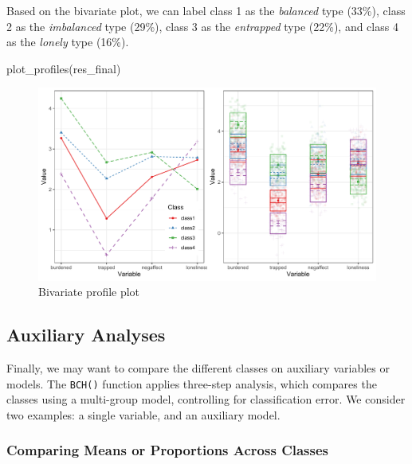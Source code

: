\documentclass[
  man,floatsintext]{apa6}
\newenvironment{Shaded}{\begin{snugshade}}{\end{snugshade}}
\newcommand{\FunctionTok}[1]{\textcolor[rgb]{0.00,0.00,0.00}{#1}}
\newcommand{\NormalTok}[1]{#1}
\begin{document}
Based on the bivariate plot, we can label class 1 as the \emph{balanced} type (33\%),
class 2 as the \emph{imbalanced} type (29\%), class 3 as the \emph{entrapped} type (22\%),
and class 4 as the \emph{lonely} type (16\%).

\begin{Shaded}
\begin{Highlighting}[]
\FunctionTok{plot\_profiles}\NormalTok{(res\_final)}
\end{Highlighting}
\end{Shaded}

\begin{figure}
\includegraphics[width=1\linewidth]{appendices/lpa_profiles} \caption{Bivariate profile plot}\label{fig:unnamed-chunk-19}
\end{figure}

\hypertarget{auxiliary-analyses}{%
\subsection{Auxiliary Analyses}\label{auxiliary-analyses}}

Finally, we may want to compare the different classes on auxiliary variables or models.
The \texttt{BCH()} function applies three-step analysis,
which compares the classes using a multi-group model,
controlling for classification error.
We consider two examples: a single variable, and an auxiliary model.

\hypertarget{comparing-means-or-proportions-across-classes}{%
\subsubsection{Comparing Means or Proportions Across Classes}\label{comparing-means-or-proportions-across-classes}}
\end{document}
